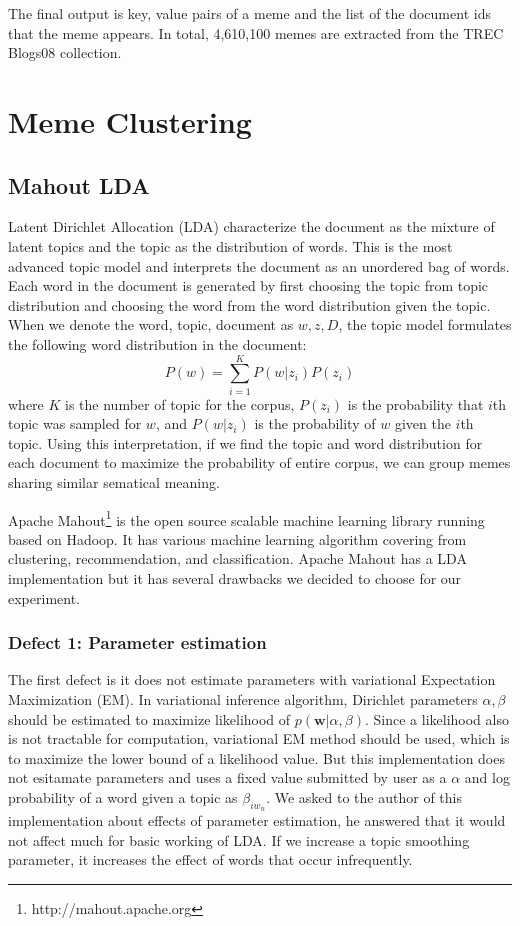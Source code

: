 \documentclass{sig-alternate}
\begin{document}
The final output is key, value pairs of a meme and the list of the document ids that the meme appears. In total, 4,610,100 memes are extracted from the TREC Blogs08 collection.

\section{Meme Clustering}

\subsection{Mahout LDA}
Latent Dirichlet Allocation (LDA) \cite{Blei2003} characterize the document as the mixture of latent topics and the topic as the distribution of words. This is the most advanced topic model and interprets the document as an unordered bag of words. Each word in the document is generated by first choosing the topic from topic distribution and choosing the word from the word distribution given the topic. When we denote the word, topic, document as $w, z, D$, the topic model formulates the following word distribution in the document:
\begin{displaymath}
 P(w)=\sum_{i=1}^K P(w|z_i)P(z_i)
\end{displaymath}
where $K$ is the number of topic for the corpus, $P(z_i)$ is the probability that $i$th topic was sampled for $w$, and $P(w|z_i)$ is the probability of $w$ given the $i$th topic. Using this interpretation, if we find the topic and word distribution for each document to maximize the probability of entire corpus, we can group memes sharing similar sematical meaning.

Apache Mahout\footnote{http://mahout.apache.org} is the open source scalable machine learning library running based on Hadoop. It has various machine learning algorithm covering from clustering, recommendation, and classification. Apache Mahout has a LDA implementation but it has several drawbacks we decided to choose for our experiment.

\subsubsection{Defect 1: Parameter estimation}
The first defect is it does not estimate parameters with variational Expectation Maximization (EM). In variational inference algorithm, Dirichlet parameters $\alpha, \beta$ should be estimated to maximize likelihood of $p(\mathbf{w}|\alpha,\beta)$. Since a likelihood also is not tractable for computation, variational EM method should be used, which is to maximize the lower bound of a likelihood value. But this implementation does not esitamate parameters and uses a fixed value submitted by user as a $\alpha$ and log probability of a word given a topic as $\beta_{iw_n}$. We asked to the author of this implementation about effects of parameter estimation, he answered that it would not affect much for basic working of LDA. If we increase a topic smoothing parameter, it increases the effect of words that occur infrequently.
\end{document}

